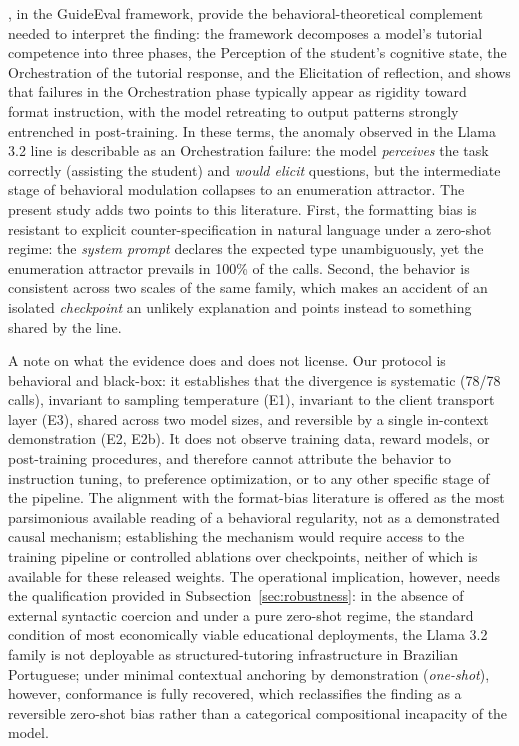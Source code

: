 \documentclass{sbc2023}%
\begin{document}
\citet{liu2025socratic}, in the GuideEval framework, provide the behavioral-theoretical complement needed to interpret the finding: the framework decomposes a model's tutorial competence into three phases, the Perception of the student's cognitive state, the Orchestration of the tutorial response, and the Elicitation of reflection, and shows that failures in the Orchestration phase typically appear as rigidity toward format instruction, with the model retreating to output patterns strongly entrenched in post-training. In these terms, the anomaly observed in the Llama 3.2 line is describable as an Orchestration failure: the model \textit{perceives} the task correctly (assisting the student) and \textit{would elicit} questions, but the intermediate stage of behavioral modulation collapses to an enumeration attractor. The present study adds two points to this literature. First, the formatting bias is resistant to explicit counter-specification in natural language under a zero-shot regime: the \textit{system prompt} declares the expected type unambiguously, yet the enumeration attractor prevails in 100\% of the calls. Second, the behavior is consistent across two scales of the same family, which makes an accident of an isolated \textit{checkpoint} an unlikely explanation and points instead to something shared by the line.

A note on what the evidence does and does not license. Our protocol is behavioral and black-box: it establishes that the divergence is systematic (78/78 calls), invariant to sampling temperature (E1), invariant to the client transport layer (E3), shared across two model sizes, and reversible by a single in-context demonstration (E2, E2b). It does not observe training data, reward models, or post-training procedures, and therefore cannot attribute the behavior to instruction tuning, to preference optimization, or to any other specific stage of the pipeline. The alignment with the format-bias literature is offered as the most parsimonious available reading of a behavioral regularity, not as a demonstrated causal mechanism; establishing the mechanism would require access to the training pipeline or controlled ablations over checkpoints, neither of which is available for these released weights. The operational implication, however, needs the qualification provided in Subsection~\ref{sec:robustness}: in the absence of external syntactic coercion and under a pure zero-shot regime, the standard condition of most economically viable educational deployments, the Llama 3.2 family is not deployable as structured-tutoring infrastructure in Brazilian Portuguese; under minimal contextual anchoring by demonstration (\textit{one-shot}), however, conformance is fully recovered, which reclassifies the finding as a reversible zero-shot bias rather than a categorical compositional incapacity of the model.
\end{document}
